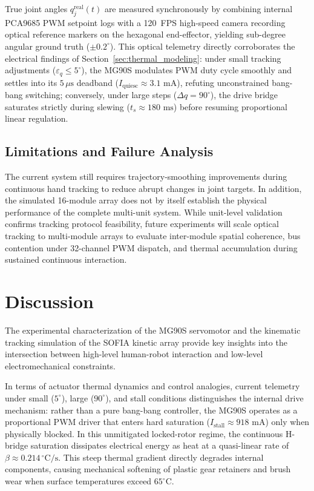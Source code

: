 \documentclass[lettersize,journal]{IEEEtran}
\begin{document}
	True joint angles $q_j^{\text{real}}(t)$ are measured synchronously by
	combining internal PCA9685 PWM setpoint logs with a 120~FPS high-speed
	camera recording optical reference markers on the hexagonal end-effector,
	yielding sub-degree angular ground truth ($\pm 0.2^\circ$). This optical
	telemetry directly corroborates the electrical findings of Section~\ref{sec:thermal_modeling}:
	under small tracking adjustments ($\varepsilon_q \le 5^\circ$), the MG90S
	modulates PWM duty cycle smoothly and settles into its $5\,\mu\text{s}$ deadband
	($I_{\text{quiesc}} \approx 3.1\text{ mA}$), refuting unconstrained bang-bang
	switching; conversely, under large steps ($\Delta q = 90^\circ$), the drive bridge
	saturates strictly during slewing ($t_s \approx 180\text{ ms}$) before resuming
	proportional linear regulation.
	
	\subsection{Limitations and Failure Analysis}
	\label{sec:limitations}
	
	The current system still requires trajectory-smoothing improvements
	during continuous hand tracking to reduce abrupt changes in joint
	targets. In addition, the simulated 16-module array does not by
	itself establish the physical performance of the complete multi-unit system.
	While unit-level validation confirms tracking protocol feasibility,
	future experiments will scale optical tracking to multi-module arrays to
	evaluate inter-module spatial coherence, bus contention under 32-channel PWM
	dispatch, and thermal accumulation during sustained continuous interaction.
	
	\section{Discussion}
	\label{sec:discussion}
	
	The experimental characterization of the MG90S servomotor and the kinematic tracking simulation of the SOFIA kinetic array provide key insights into the intersection between high-level human-robot interaction and low-level electromechanical constraints.
	
	In terms of actuator thermal dynamics and control analogies, current telemetry under small ($5^\circ$), large ($90^\circ$), and stall conditions distinguishes the internal drive mechanism: rather than a pure bang-bang controller, the MG90S operates as a proportional PWM driver that enters hard saturation ($I_{\text{stall}} \approx 918\text{ mA}$) only when physically blocked. In this unmitigated locked-rotor regime, the continuous H-bridge saturation dissipates electrical energy as heat at a quasi-linear rate of $\beta \approx 0.214\,^\circ\text{C/s}$. This steep thermal gradient directly degrades internal components, causing mechanical softening of plastic gear retainers and brush wear when surface temperatures exceed $65^\circ\text{C}$.
	
\end{document}
